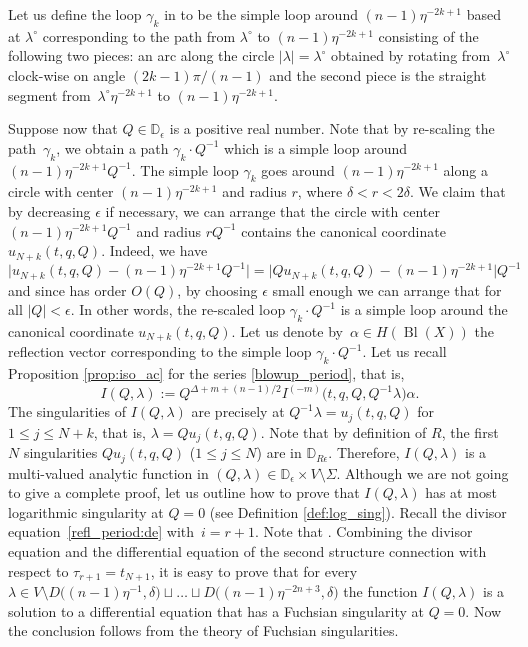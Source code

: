 \documentclass[pdftex]{sigma}
\numberwithin{equation}{section}
\begin{document}
Let us define the loop $\gamma_k$ in  to be the simple loop around $(n-1)\eta^{-2k+1}$ based at $\lambda^\circ$ corresponding to the path from $\lambda^\circ$ to $(n-1)\eta^{-2k+1}$ consisting of the following two pieces: an arc along the circle $|\lambda|=\lambda^\circ$ obtained by rotating from~$\lambda^\circ$ clock-wise on angle $(2k-1)\pi/(n-1)$ and the second piece is the straight segment from~$\lambda^\circ \eta^{-2k+1}$ to $(n-1)\eta^{-2k+1}$.

Suppose now that $Q\in \mathbb{D}_\epsilon$ is a positive real number. Note that by re-scaling the path~$\gamma_k$, we obtain a path $\gamma_k\cdot Q^{-1}$ which is a simple loop around $(n-1)\eta^{-2k+1}Q^{-1}$. The simple loop $\gamma_k$ goes around $(n-1)\eta^{-2k+1}$ along a circle with center $(n-1)\eta^{-2k+1}$ and radius $r$, where $\delta<r<2\delta$. We claim that by decreasing $\epsilon$ if necessary, we can arrange that the circle with center $(n-1)\eta^{-2k+1} Q^{-1}$ and radius $r Q^{-1}$ contains the canonical coordinate $u_{N+k}(t,q,Q)$. Indeed, we have
\[
\big|u_{N+k}(t,q,Q)-(n-1) \eta^{-2k+1} Q^{-1}\big|=
\big|Qu_{N+k}(t,q,Q)-(n-1) \eta^{-2k+1}\big| Q^{-1}
\]
and since  has order $O(Q)$, by choosing $\epsilon$ small enough we can arrange that  for all $|Q|<\epsilon$. In other words, the re-scaled loop $\gamma_k \cdot Q^{-1}$ is a simple loop around the canonical coordinate $u_{N+k}(t,q,Q)$. Let us denote by~${\alpha\in H(\operatorname{Bl}(X))}$ the reflection vector corresponding to the simple loop $\gamma_k \cdot Q^{-1}$. Let us recall Proposition \ref{prop:iso_ac} for the series \eqref{blowup_period}, that is,
\[%
I(Q,\lambda):= Q^{\Delta+m+(n-1)/2} I^{(-m)}\big(t,q,Q,Q^{-1}\lambda\big)\alpha.
\]
The singularities of $I(Q,\lambda)$ are precisely at $Q^{-1}\lambda = u_j(t,q,Q)$ for $1\leq j\leq N+k$, that is, $\lambda=Q u_j(t,q,Q)$. Note that by definition of $R$, the first $N$ singularities $Qu_j(t,q,Q)$ (${1\leq j\leq N}$) are in $\mathbb{D}_{R\epsilon}$. Therefore, $I(Q,\lambda)$ is a multi-valued analytic function in $(Q,\lambda)\in \mathbb{D}_\epsilon \times V\setminus{\Sigma}$. Although we are not going to give a complete proof, let us outline how to prove that $I(Q,\lambda)$ has at most logarithmic singularity at $Q=0$ (see Definition \ref{def:log_sing}). Recall the divisor equation~\eqref{refl_period:de} with~${i=r+1}$. Note that . Combining the divisor equation and the differential equation of the second structure connection with respect to $\tau_{r+1}=t_{N+1}$, it is easy to prove that for every $\lambda\in V\setminus{D\big((n-1)\eta^{-1},\delta\big)\sqcup\dots\sqcup D\big((n-1)\eta^{-2n+3},\delta\big)}$ the function $I(Q,\lambda)$ is a solution to a differential equation that has a Fuchsian singularity at $Q=0$. Now the conclusion follows from the theory of Fuchsian singularities.
\end{document}
